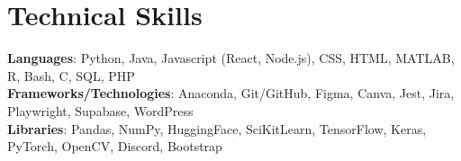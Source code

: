 \section{Technical Skills}
 \begin{itemize}[leftmargin=0.15in, label={}]
    \small{\item{
     \textbf{Languages}{: Python, Java, Javascript (React, Node.js), CSS, HTML, MATLAB, R, Bash, C, SQL, PHP} \\
     \textbf{Frameworks/Technologies}{: Anaconda, Git/GitHub, Figma, Canva, Jest, Jira, Playwright, Supabase, WordPress} \\
     \textbf{Libraries}{: Pandas, NumPy, HuggingFace, SciKitLearn, TensorFlow, Keras, PyTorch, OpenCV, Discord, Bootstrap}
    }}
 \end{itemize}
